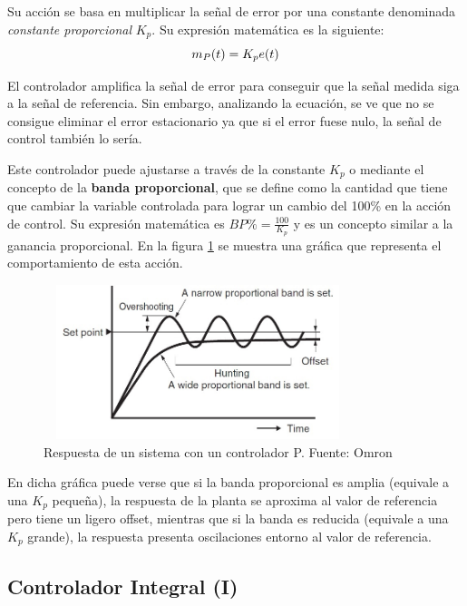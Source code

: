 	Su acción se basa en multiplicar la señal de error por una constante denominada \textit{constante proporcional} $K_{p}$. Su expresión matemática es la siguiente:
\begin{equation}\label{ecuacion2_1}
\normalsize m_{P}(t) =K_{p}e(t)
\end{equation}

	El controlador amplifica la señal de error para conseguir que la señal medida siga a la señal de referencia. Sin embargo, analizando la ecuación, se ve que no se consigue eliminar el error estacionario ya que si el error fuese nulo, la señal de control también lo sería. 

	Este controlador puede ajustarse a través de la constante $K_{p}$ o mediante el concepto de la \textbf{banda proporcional}, que se define como la cantidad que tiene que cambiar la variable controlada para lograr un cambio del 100\% en la acción de control. Su expresión matemática es  $BP\%=\frac{100}{K_{p}}$ y es un concepto similar a la ganancia proporcional. En la figura \ref{fig2_3_1:proporcional} se muestra una gráfica que representa el comportamiento de esta acción.

\begin{figure}[htbp]
\centering
\includegraphics[width=90mm,height=45mm]{imagenes/capitulo2/2_3_1_Proporcional}
\caption {Respuesta de un sistema con un controlador P. Fuente: Omron \cite{fabricante1}}
\label{fig2_3_1:proporcional}
\end{figure}

	En dicha gráfica puede verse que si la banda proporcional es amplia (equivale a una $K_{p}$ pequeña), la respuesta de la planta se aproxima al valor de referencia pero tiene un ligero offset, mientras que si la banda es reducida (equivale a una $K_{p}$ grande), la respuesta presenta oscilaciones entorno al valor de referencia.

\subsection{Controlador Integral (I)}


